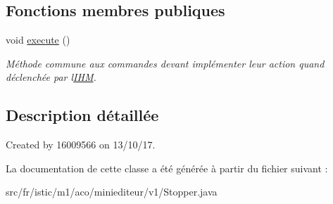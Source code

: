 \subsection*{Fonctions membres publiques}
\begin{DoxyCompactItemize}
\item 
\mbox{\label{classfr_1_1istic_1_1m1_1_1aco_1_1miniediteur_1_1v1_1_1Stopper_a39d1f6428e1fb70e179c45537e41a20e}} 
void \hyperlink{classfr_1_1istic_1_1m1_1_1aco_1_1miniediteur_1_1v1_1_1Stopper_a39d1f6428e1fb70e179c45537e41a20e}{execute} ()
\begin{DoxyCompactList}\small\item\em Méthode commune aux commandes devant implémenter leur action quand déclenchée par l\textquotesingle{}\hyperlink{interfacefr_1_1istic_1_1m1_1_1aco_1_1miniediteur_1_1v1_1_1IHM}{I\+HM}. \end{DoxyCompactList}\end{DoxyCompactItemize}


\subsection{Description détaillée}
Created by 16009566 on 13/10/17. 

La documentation de cette classe a été générée à partir du fichier suivant \+:\begin{DoxyCompactItemize}
\item 
src/fr/istic/m1/aco/miniediteur/v1/Stopper.\+java\end{DoxyCompactItemize}
